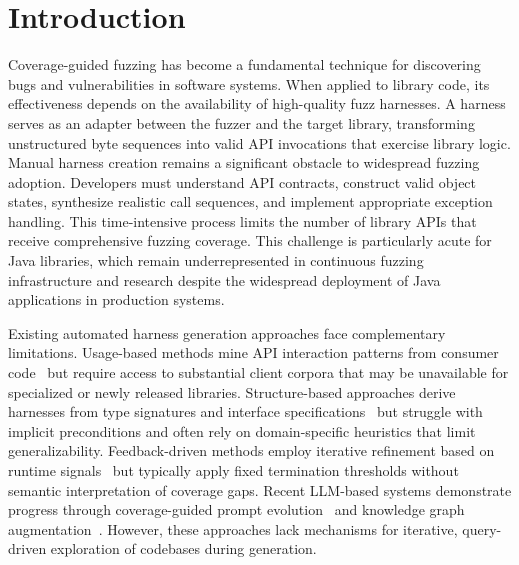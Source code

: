 \section{Introduction}

Coverage-guided fuzzing has become a fundamental technique for discovering bugs and vulnerabilities in software systems. When applied to library code, its effectiveness depends on the availability of high-quality fuzz harnesses. A harness serves as an adapter between the fuzzer and the target library, transforming unstructured byte sequences into valid API invocations that exercise library logic. Manual harness creation remains a significant obstacle to widespread fuzzing adoption. Developers must understand API contracts, construct valid object states, synthesize realistic call sequences, and implement appropriate exception handling. This time-intensive process limits the number of library APIs that receive comprehensive fuzzing coverage. This challenge is particularly acute for Java libraries, which remain underrepresented in continuous fuzzing infrastructure and research despite the widespread deployment of Java applications in production systems. 

Existing automated harness generation approaches face complementary limitations. Usage-based methods mine API interaction patterns from consumer code~\cite{DBLP:conf/sigsoft/BabicBCIKKLSW19:FUDGE,DBLP:conf/sp/JeongJYMKJKSH23:UTopia} but require access to substantial client corpora that may be unavailable for specialized or newly released libraries. Structure-based approaches derive harnesses from type signatures and interface specifications~\cite{DBLP:conf/icse:GreenA22:GraphFuzz,DBLP:conf/icse:ShermanN25:OGHarn} but struggle with implicit preconditions and often rely on domain-specific heuristics that limit generalizability. Feedback-driven methods employ iterative refinement based on runtime signals~\cite{DBLP:conf/uss:ZhangLZZZZXLL0H23:Rubick} but typically apply fixed termination thresholds without semantic interpretation of coverage gaps. Recent LLM-based systems demonstrate progress through coverage-guided prompt evolution~\cite{DBLP:conf/ccs:LyuXCC24:PromptFuzz} and knowledge graph augmentation~\cite{DBLP:conf/icse:XuMZZCHLW25:CKGFuzzer}. However, these approaches lack mechanisms for iterative, query-driven exploration of codebases during generation. 

